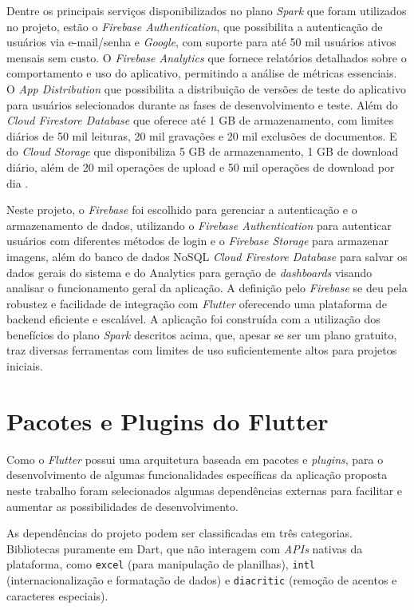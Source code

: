 Dentre os principais serviços disponibilizados no plano \textit{Spark} que foram 
utilizados no projeto, estão o \textit{Firebase Authentication}, 
que possibilita a autenticação de usuários via e-mail/senha e \textit{Google}, com suporte 
para até 50 mil usuários ativos mensais sem custo. O \textit{Firebase Analytics} que fornece 
relatórios detalhados sobre o comportamento e uso do aplicativo, permitindo a 
análise de métricas essenciais. O \textit{App Distribution} que possibilita a distribuição de versões 
de teste do aplicativo para usuários selecionados durante as fases de desenvolvimento e teste. 
Além do \textit{Cloud Firestore Database} que oferece até 1 GB de armazenamento, com limites diários de 50 
mil leituras, 20 mil gravações e 20 mil exclusões de documentos. E do \textit{Cloud Storage} que
disponibiliza 5 GB de armazenamento, 1 GB de download diário, além de 20 mil operações 
de upload e 50 mil operações de download por dia \cite{firebase2025}.

Neste projeto, o \textit{Firebase} foi escolhido para gerenciar a autenticação e o armazenamento de 
dados, utilizando o \textit{Firebase Authentication} para autenticar usuários com diferentes métodos de login e 
o \textit{Firebase Storage} para armazenar imagens, além do banco de dados NoSQL 
\textit{Cloud Firestore Database} para salvar os dados gerais do sistema e do Analytics para 
geração de \textit{dashboards} visando analisar o funcionamento geral da aplicação.
A definição pelo \textit{Firebase} se deu pela robustez e facilidade de integração com \textit{Flutter} 
oferecendo uma plataforma de backend eficiente e escalável. A aplicação foi construída com a 
utilização dos benefícios do plano \textit{Spark} descritos acima,
que, apesar se ser um plano gratuito, traz diversas ferramentas com limites de uso suficientemente 
altos para projetos iniciais.

\section{Pacotes e Plugins do Flutter}

Como o \textit{Flutter} possui uma arquitetura baseada em pacotes e \textit{plugins}, para o desenvolvimento 
de algumas funcionalidades específicas da aplicação proposta neste trabalho foram selecionados 
algumas dependências externas para facilitar e aumentar as possibilidades de desenvolvimento.

As dependências do projeto podem ser classificadas em três categorias. Bibliotecas puramente em Dart, 
que não interagem com \textit{APIs} nativas da 
plataforma, como \texttt{excel} (para manipulação de planilhas), \texttt{intl} (internacionalização 
e formatação de dados) e \texttt{diacritic} (remoção de acentos e caracteres especiais).

